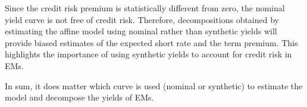 {%
%	
%	

Since the credit risk premium is statistically different from zero, the nominal yield curve is not free of credit risk.
Therefore, decompositions obtained by estimating the affine model using nominal rather than synthetic yields will provide biased estimates of the expected short rate and the term premium.
This highlights the importance of using synthetic yields to account for credit risk in EMs.

In sum, it does matter which curve is used (nominal or synthetic) to estimate the model and decompose the yields of EMs. 

}
